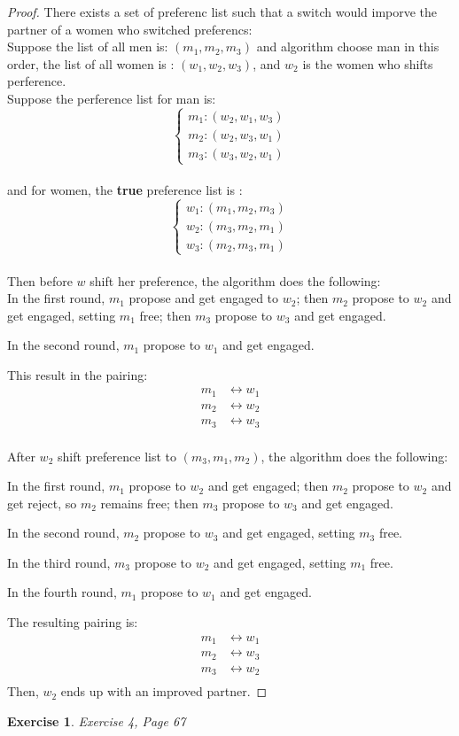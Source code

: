 \documentclass[11pt]{amsart}
\theoremstyle{theorem}
\newtheorem{exercise}{Exercise}
\begin{document}
\begin{proof}
There exists a set of preferenc list such that a switch would imporve the partner of a women who switched preferencs:\\
Suppose the list of all men is: $ (m_1, m_2, m_3) $ and algorithm choose man in this order, the list of all women is : $ (w_1, w_2, w_3) $, and $ w_2 $ is the women who shifts perference.\\
Suppose the perference list for man is:
\[
\begin{cases}
	m_1 : (w_2, w_1, w_3)\\
	m_2 : (w_2, w_3, w_1)\\
	m_3 : (w_3, w_2, w_1)
\end{cases}\]\\
and for women, the \textbf{true} preference list is :
\[\begin{cases}
w_1:(m_1,m_2,m_3)\\
w_2: (m_3,m_2,m_1)\\
w_3:(m_2, m_3, m_1)
\end{cases}
\]\\
Then before $ w $ shift her preference, the algorithm does the following:\\

In the first round, $ m_1 $ propose and get engaged to $ w_2 $; then $ m_2 $ propose to $ w_2 $ and get engaged, setting $ m_1 $ free; then $ m_3 $ propose to $ w_3 $ and get engaged. 

In the second round, $ m_1 $ propose to $ w_1 $ and get engaged.

This result in the pairing:\begin{align*}
m_1 &\longleftrightarrow w_1\\
m_2 &\longleftrightarrow w_2\\
m_3 &\longleftrightarrow w_3
\end{align*}\\
After $ w_2 $ shift preference list to $ (m_3,m_1,m_2) $, the algorithm does the following:

In the first round, $ m_1 $ propose to $ w_2 $ and get engaged; then $ m_2 $ propose to $ w_2 $ and get reject, so $ m_2 $ remains free; then $ m_3 $ propose to $ w_3 $ and get engaged.

In the second round, $ m_2 $ propose to $ w_3 $ and get engaged, setting $ m_3 $ free.

In the third round, $ m_3 $ propose to $ w_2 $ and get engaged, setting $ m_1 $ free.

In the fourth round, $ m_1 $ propose to $ w_1 $ and get engaged.

The resulting pairing is:
\begin{align*}
m_1 &\longleftrightarrow w_1\\
m_2 &\longleftrightarrow w_3\\
m_3 &\longleftrightarrow w_2\\
\end{align*}
Then, $ w_2 $ ends up with an improved partner.
\end{proof}
\hfill
\begin{exercise}
	Exercise 4, Page 67
\end{exercise}
\end{document}
